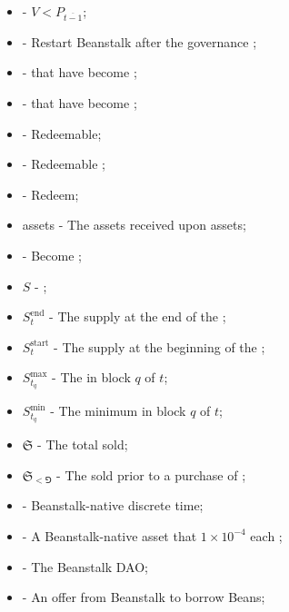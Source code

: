 \documentclass[class=article, crop=false]{standalone}
\begin{document}
\begin{itemize}[topsep=0pt, itemsep=3pt,leftmargin=16pt]
    \item[]  - \hypertarget{ht161}{$V < P_{\overline{t-1}}$};
    \item[]  - \hypertarget{ht162}{Restart Beanstalk after the governance };
    \item[]  - \hypertarget{ht163}{ that have become };
    \item[]  - \hypertarget{ht164}{ that have become };
    \item[]  - \hypertarget{ht165}{Redeemable};
    \item[]  - \hypertarget{ht166}{Redeemable };
    \item[]  - \hypertarget{ht167}{Redeem};
    \item[]  assets - \hypertarget{ht168}{The assets received upon   assets};
    \item[]  - \hypertarget{ht169}{Become };
    \item[] $S$ - \hypertarget{ht170}{};
    \item[] $S_t^{\text{end}}$ - \hypertarget{ht171}{The  supply at the end of the };
    \item[] $S_t^{\text{start}}$ - \hypertarget{ht173}{The  supply at the beginning of the };
    \item[] $S_{t_q}^{\text{max}}$ - The  in block $q$ of $t$;
    \item[] $S_{t_q}^{\text{min}}$ - The minimum  in block $q$ of $t$;
    \item[] $\mathfrak{S}$ - \hypertarget{ht174}{The total  sold};
    \item[] $\mathfrak{S}_{<\Game}$ - \hypertarget{ht175}{The  sold prior to a purchase of };
    \item[]  - \hypertarget{ht176}{Beanstalk-native discrete time};
    \item[]  - \hypertarget{ht176}{A Beanstalk-native asset that  $1 \times 10^{-4}$  each };
    \item[]  - \hypertarget{ht177}{The Beanstalk DAO};
    \item[]  - \hypertarget{ht178}{An offer from Beanstalk to borrow Beans};

\end{itemize}
\end{document}
